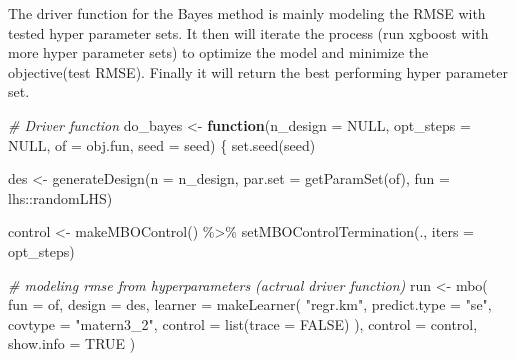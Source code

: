 \documentclass[
]{article}
\newenvironment{Shaded}{\begin{snugshade}}{\end{snugshade}}
\newcommand{\AttributeTok}[1]{\textcolor[rgb]{0.77,0.63,0.00}{#1}}
\newcommand{\CommentTok}[1]{\textcolor[rgb]{0.56,0.35,0.01}{\textit{#1}}}
\newcommand{\ConstantTok}[1]{\textcolor[rgb]{0.00,0.00,0.00}{#1}}
\newcommand{\ControlFlowTok}[1]{\textcolor[rgb]{0.13,0.29,0.53}{\textbf{#1}}}
\newcommand{\FunctionTok}[1]{\textcolor[rgb]{0.00,0.00,0.00}{#1}}
\newcommand{\NormalTok}[1]{#1}
\newcommand{\OtherTok}[1]{\textcolor[rgb]{0.56,0.35,0.01}{#1}}
\newcommand{\SpecialCharTok}[1]{\textcolor[rgb]{0.00,0.00,0.00}{#1}}
\newcommand{\StringTok}[1]{\textcolor[rgb]{0.31,0.60,0.02}{#1}}
\begin{document}
The driver function for the Bayes method is mainly modeling the RMSE
with tested hyper parameter sets. It then will iterate the process (run
xgboost with more hyper parameter sets) to optimize the model and
minimize the objective(test RMSE). Finally it will return the best
performing hyper parameter set.

\begin{Shaded}
\begin{Highlighting}[]
\CommentTok{\# Driver function }
\NormalTok{do\_bayes }\OtherTok{\textless{}{-}}
  \ControlFlowTok{function}\NormalTok{(}\AttributeTok{n\_design =} \ConstantTok{NULL}\NormalTok{,}
           \AttributeTok{opt\_steps =} \ConstantTok{NULL}\NormalTok{,}
           \AttributeTok{of =}\NormalTok{ obj.fun,}
           \AttributeTok{seed =}\NormalTok{ seed) \{}
    \FunctionTok{set.seed}\NormalTok{(seed)}
    
\NormalTok{    des }\OtherTok{\textless{}{-}} \FunctionTok{generateDesign}\NormalTok{(}\AttributeTok{n =}\NormalTok{ n\_design,}
                          \AttributeTok{par.set =} \FunctionTok{getParamSet}\NormalTok{(of),}
                          \AttributeTok{fun =}\NormalTok{ lhs}\SpecialCharTok{::}\NormalTok{randomLHS)}
    
\NormalTok{    control }\OtherTok{\textless{}{-}}
      \FunctionTok{makeMBOControl}\NormalTok{() }\SpecialCharTok{\%\textgreater{}\%} \FunctionTok{setMBOControlTermination}\NormalTok{(., }\AttributeTok{iters =}\NormalTok{ opt\_steps)}
    
    \CommentTok{\# modeling rmse from hyperparameters (actrual driver function)}
\NormalTok{    run }\OtherTok{\textless{}{-}} \FunctionTok{mbo}\NormalTok{(}
      \AttributeTok{fun =}\NormalTok{ of,}
      \AttributeTok{design =}\NormalTok{ des,}
      \AttributeTok{learner =} \FunctionTok{makeLearner}\NormalTok{(}
        \StringTok{"regr.km"}\NormalTok{,}
        \AttributeTok{predict.type =} \StringTok{"se"}\NormalTok{,}
        \AttributeTok{covtype =} \StringTok{"matern3\_2"}\NormalTok{,}
        \AttributeTok{control =} \FunctionTok{list}\NormalTok{(}\AttributeTok{trace =} \ConstantTok{FALSE}\NormalTok{)}
\NormalTok{      ),}
      \AttributeTok{control =}\NormalTok{ control,}
      \AttributeTok{show.info =} \ConstantTok{TRUE}
\NormalTok{    )}
    

\end{Highlighting}
\end{Shaded}
\end{document}

